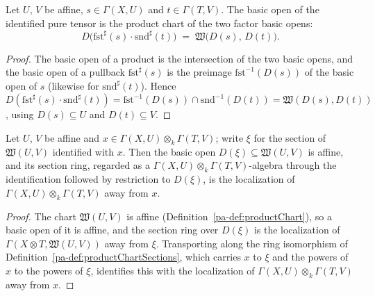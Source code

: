 \begin{lemma}
  \label{pa-lem:basicOpen_productChartSections_tmul}
  \leanok

  Let \(U\), \(V\) be affine, \(s \in \Gamma(X,U)\) and \(t \in \Gamma(T,V)\). The basic open of
  the identified pure tensor is the product chart of the two factor basic opens:
  \[
    D\bigl(\mathrm{fst}^\sharp(s) \cdot \mathrm{snd}^\sharp(t)\bigr)
      \;=\; \mathfrak W\bigl(D(s),\, D(t)\bigr).
  \]
\end{lemma}
\begin{proof}
  \leanok
  The basic open of a product is the intersection of the two basic opens, and the basic open of a
  pullback \(\mathrm{fst}^\sharp(s)\) is the preimage \(\mathrm{fst}^{-1}(D(s))\) of the basic open
  of \(s\) (likewise for \(\mathrm{snd}^\sharp(t)\)). Hence
  \(D(\mathrm{fst}^\sharp(s) \cdot \mathrm{snd}^\sharp(t)) = \mathrm{fst}^{-1}(D(s)) \cap \mathrm{snd}^{-1}(D(t))
  = \mathfrak W(D(s), D(t))\), using \(D(s) \subseteq U\) and \(D(t) \subseteq V\).
\end{proof}

\begin{theorem}
  \label{pa-thm:isLocalization_away_basicOpen_productChartSections}
  \leanok

  Let \(U\), \(V\) be affine and \(x \in \Gamma(X,U) \otimes_k \Gamma(T,V)\); write \(\xi\) for
  the section of \(\mathfrak W(U,V)\) identified with \(x\). Then the basic open
  \(D(\xi) \subseteq \mathfrak W(U,V)\) is affine, and its section ring, regarded as a
  \(\Gamma(X,U) \otimes_k \Gamma(T,V)\)-algebra through the identification followed by restriction
  to \(D(\xi)\), is the localization of \(\Gamma(X,U) \otimes_k \Gamma(T,V)\) away from \(x\).
\end{theorem}
\begin{proof}
  \leanok
  The chart \(\mathfrak W(U,V)\) is affine (Definition~\ref{pa-def:productChart}), so a basic open of
  it is affine, and the section ring over \(D(\xi)\) is the localization of
  \(\Gamma(X \otimes T, \mathfrak W(U,V))\) away from \(\xi\). Transporting along the ring
  isomorphism of Definition~\ref{pa-def:productChartSections}, which carries \(x\) to \(\xi\) and the
  powers of \(x\) to the powers of \(\xi\), identifies this with the localization of
  \(\Gamma(X,U) \otimes_k \Gamma(T,V)\) away from \(x\).
\end{proof}

